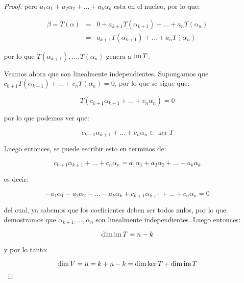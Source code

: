 \begin{proof}
			pero $a_1 \alpha_1 + a_2 \alpha_2 + \dots + a_k \alpha_k$ esta en el nucleo, por lo que:

			\begin{eqnarray*}
				\beta = T(\alpha) & = & 0 + a_{k+1} T(\alpha_{k+1}) + \dots + a_n T(\alpha_n) \\
				& = & a_{k+1} T(\alpha_{k+1}) + \dots + a_n T(\alpha_n)
			\end{eqnarray*}

			por lo que $T(\alpha_{k+1}), \dots, T(\alpha_n)$ genera a $\operatorname{im}{T}$.

			Veamos ahora que son linealmente independientes.
			Supongamos que $c_{k+1} T(\alpha_{k+1}) + \dots + c_n T(\alpha_n) = 0$, por lo que se sigue que:

			\begin{equation*}
				T(c_{k+1} \alpha_{k+1} + \dots + c_n \alpha_n) = 0
			\end{equation*}

			por lo que podemos ver que:

			\begin{equation*}
				c_{k+1} \alpha_{k+1} + \dots + c_n \alpha_n \in \ker{T}
			\end{equation*}

			Luego entonces, se puede escribir esto en terminos de:

			\begin{equation*}
				c_{k+1} \alpha_{k+1} + \dots + c_n \alpha_n = a_1 \alpha_1 + a_2 \alpha_2 + \dots + a_k \alpha_k
			\end{equation*}

			es decir:

			\begin{equation*}
				-a_1 \alpha_1 - a_2 \alpha_2 - \dots - a_k \alpha_k + c_{k+1} \alpha_{k+1} + \dots + c_n \alpha_n = 0
			\end{equation*}

			del cual, ya sabemos que los coeficientes deben ser todos nulos, por lo que demostramos que $\alpha_{k+1}, \dots, \alpha_n$ son linealmente independientes.
			Luego entonces:

			\begin{equation*}
				\dim{\operatorname{im}{T}} = n - k
			\end{equation*}

			y por lo tanto:

			\begin{equation*}
				\dim{V} = n = k + n - k = \dim{\ker{T}} + \dim{\operatorname{im}{T}}
			\end{equation*}
		\end{proof}

